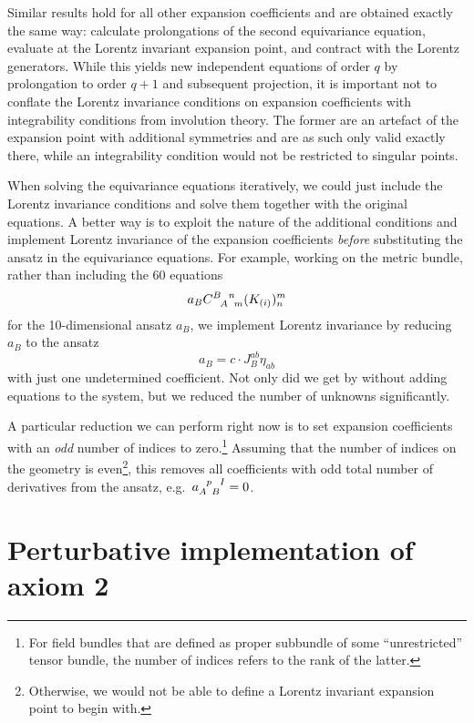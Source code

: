 Similar results hold for all other expansion coefficients and are obtained exactly the same way: calculate prolongations of the second equivariance equation, evaluate at the Lorentz invariant expansion point, and contract with the Lorentz generators. While this yields new independent equations of order $q$ by prolongation to order $q+1$ and subsequent projection, it is important not to conflate the Lorentz invariance conditions on expansion coefficients with integrability conditions from involution theory. The former are an artefact of the expansion point with additional symmetries and are as such only valid exactly there, while an integrability condition would not be restricted to singular points.

When solving the equivariance equations iteratively, we could just include the Lorentz invariance conditions and solve them together with the original equations. A better way is to exploit the nature of the additional conditions and implement Lorentz invariance of the expansion coefficients \emph{before} substituting the ansatz in the equivariance equations. For example, working on the metric bundle, rather than including the 60 equations
\begin{equation}
  a_B \gmc{B}{A}{n}{m}(K_{(i)})^m_n
\end{equation}
for the 10-dimensional ansatz $a_B$, we implement Lorentz invariance by reducing $a_B$ to the ansatz
\begin{equation}
  a_B = c\cdot J_B^{ab} \eta_{ab}
\end{equation}
with just one undetermined coefficient. Not only did we get by without adding equations to the system, but we reduced the number of unknowns significantly.

A particular reduction we can perform right now is to set expansion coefficients with an \emph{odd} number of indices to zero.\footnote{For field bundles that are defined as proper subbundle of some ``unrestricted'' tensor bundle, the number of indices refers to the rank of the latter.} Assuming that the number of indices on the geometry is even\footnote{Otherwise, we would not be able to define a Lorentz invariant expansion point to begin with.}, this removes all coefficients with odd total number of derivatives from the ansatz, e.g.\ $a_{A\hphantom pB}^{\hphantom Ap\hphantom BI}=0$.

\section{Perturbative implementation of axiom 2}\label{section_axiom2_perturb}

